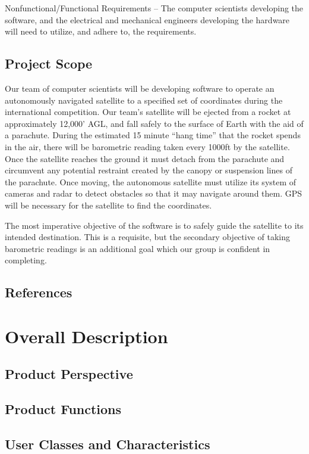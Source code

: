 \documentclass{scrreprt}
\begin{document}
Nonfunctional/Functional Requirements – The computer scientists developing the software, and the electrical and mechanical engineers developing the hardware will need to utilize, and adhere to, the requirements.

\section{Project Scope}
Our team of computer scientists will be developing software to operate an autonomously navigated satellite to a specified set of coordinates during the international competition. Our team’s satellite will be ejected from a rocket at approximately 12,000’ AGL, and fall safely to the surface of Earth with the aid of a parachute. During the estimated 15 minute “hang time” that the rocket spends in the air, there will be barometric reading taken every 1000ft by the satellite. Once the satellite reaches the ground it must detach from the parachute and circumvent any potential restraint created by the canopy or suspension lines of the parachute. Once moving, the autonomous satellite must utilize its system of cameras and radar to detect obstacles so that it may navigate around them. GPS will be necessary for the satellite to find the coordinates.

The most imperative objective of the software is to safely guide the satellite to its intended destination. This is a requisite, but the secondary objective of taking barometric readings is an additional goal which our group is confident in completing.


\section{References}



\chapter{Overall Description}

\section{Product Perspective}


\section{Product Functions}


\section{User Classes and Characteristics}
\end{document}
